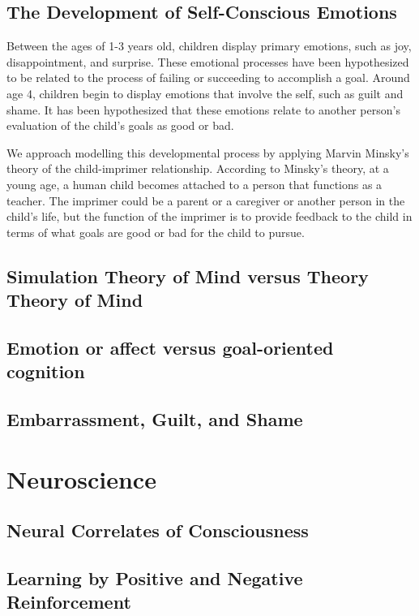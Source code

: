 \subsection{The Development of Self-Conscious Emotions}

Between the ages of 1-3 years old, children display primary emotions,
such as joy, disappointment, and surprise.  These emotional processes
have been hypothesized to be related to the process of failing or
succeeding to accomplish a goal.  Around age 4, children begin to
display emotions that involve the self, such as guilt and shame.  It
has been hypothesized that these emotions relate to another person's
evaluation of the child's goals as good or bad.

We approach modelling this developmental process by applying Marvin
Minsky's theory of the child-imprimer relationship.  According to
Minsky's theory, at a young age, a human child becomes attached to a
person that functions as a teacher.  The imprimer could be a parent or
a caregiver or another person in the child's life, but the function of
the imprimer is to provide feedback to the child in terms of what
goals are good or bad for the child to pursue.

\subsection{Simulation Theory of Mind versus Theory Theory of Mind}


\subsection{Emotion or affect versus goal-oriented cognition}


\subsection{Embarrassment, Guilt, and Shame}



\section{Neuroscience}

\subsection{Neural Correlates of Consciousness}

\subsection{Learning by Positive and Negative Reinforcement}





